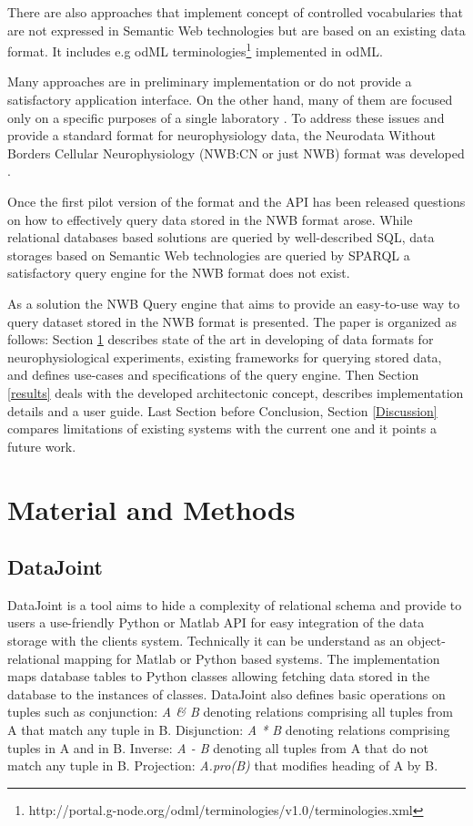 \documentclass[utf8]{frontiersSCNS} %
\begin{document}
There are also approaches that implement concept of controlled vocabularies that are not expressed in Semantic Web technologies but are based on an existing data format. It includes e.g odML terminologies\footnote{http://portal.g-node.org/odml/terminologies/v1.0/terminologies.xml} implemented in odML.

Many approaches are in preliminary implementation or do not provide a satisfactory application interface. On the other hand, many of them are focused only on a specific purposes of a single laboratory \citep{doi:10.1142/S0219635202000128}. To address these issues and provide a standard format for neurophysiology data, the Neurodata Without Borders Cellular Neurophysiology (NWB:CN or just NWB) format was developed \citep{teeters-neuron}. 

Once the first pilot version of the format and the API has been released questions on how to effectively query data stored in the NWB format arose. While relational databases based solutions are queried by well-described SQL, data storages based on Semantic Web technologies are queried by SPARQL \citep{prudhommeaux2008sparql} a satisfactory query engine for the NWB format does not exist. 

As a solution the NWB Query engine that aims to provide an easy-to-use way to query dataset stored in the NWB format is presented. 
The paper is organized as follows: Section \ref{materials_and_methods} describes state of the art in developing of data formats for neurophysiological experiments, existing frameworks for querying stored data, and defines use-cases and specifications of the query engine. Then Section  \ref{results}  deals with the developed architectonic concept, describes implementation details and a user guide. Last Section before Conclusion, Section  \ref{Discussion} compares limitations of existing systems with the current one and it points a future work. 

\section{Material and Methods}
\label{materials_and_methods}

\subsection{DataJoint}
\label{DataJoint}

DataJoint \citep{Yatsenko031658} is a tool aims to hide a complexity of relational schema and provide to users a use-friendly Python or Matlab API for easy integration of the data storage with the clients system. Technically it can be understand as an object-relational mapping \citep{Keith2010} for Matlab or Python based systems. The implementation maps database tables to Python classes allowing fetching data stored in the database to the instances of classes. DataJoint also defines basic operations on tuples such as conjunction: \emph{A \& B} denoting relations comprising all tuples from A that match any tuple in B. Disjunction: \emph{A * B} denoting relations comprising tuples in A and in B. Inverse: \emph{A - B} denoting all tuples from A that do not match any tuple in B. Projection: \emph{A.pro(B)} that modifies heading of A by B.
\end{document}
